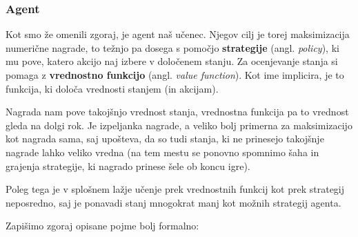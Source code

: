 \documentclass[12pt,a4paper]{amsart}
\theoremstyle{definition} %
\theoremstyle{plain} %
\begin{document}
\subsubsection{Agent}
Kot smo že omenili zgoraj, je agent naš učenec. Njegov cilj je torej maksimizacija numerične 
nagrade, to težnjo pa dosega s pomočjo \textbf{strategije} (angl. \textit{policy}), ki mu pove, 
katero akcijo naj izbere v določenem stanju. Za ocenjevanje stanja si pomaga z \textbf{vrednostno 
funkcijo} (angl. \textit{value function}). Kot ime implicira, je to funkcija, ki določa vrednosti 
stanjem (in akcijam). 

Nagrada nam pove takojšnjo vrednost stanja, vrednostna funkcija pa to vrednost gleda na dolgi
rok. Je izpeljanka nagrade, a veliko bolj primerna za maksimizacijo kot nagrada sama, saj upošteva,
da so tudi stanja, ki ne prinesejo takojšnje nagrade lahko veliko vredna (na tem mestu se ponovno 
spomnimo šaha in grajenja strategije, ki nagrado prinese šele ob koncu igre).

Poleg tega je v splošnem lažje učenje prek vrednostnih funkcij kot prek strategij neposredno, 
saj je ponavadi stanj mnogokrat manj kot možnih strategij agenta.

Zapišimo zgoraj opisane pojme bolj formalno:
\end{document}
